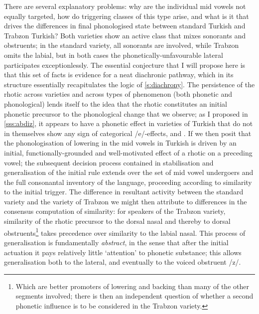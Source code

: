 There are several explanatory problems: why are the individual mid vowels not equally targeted, how do triggering classes of this type arise, and what is it that drives the differences in final phonologised state between standard Turkish and Trabzon Turkish? Both varieties show an active class that mixes sonorants and obstruents; in the standard variety, all sonorants are involved, while Trabzon omits the labial, but in both cases the phonetically-unfavourable lateral participates exceptionlessly. The essential conjecture that I will propose here is that this set of facts is evidence for a neat diachronic pathway, which in its structure essentially recapitulates the logic of \cref{s:diachrony}. The persistence of the rhotic across varieties and across types of phenomenon (both phonetic and phonological) lends itself to the idea that the rhotic constitutes an initial phonetic precursor to the phonological change that we observe; as I proposed in \cref{sss:abdiz}, it appears to have a phonetic effect in varieties of Turkish that do not in themselves show any sign of categorical /e/-effects, and . If we then posit that the phonologisation of lowering in the mid vowels in Turkish is driven by an initial, functionally-grounded and well-motivated effect of a rhotic on a preceding vowel; the subsequent decision process contained in stabilisation and generalisation of the initial rule extends over the set of mid vowel undergoers and the full consonantal inventory of the language, proceeding according to similarity to the initial trigger. The difference in resultant activity between the standard variety and the variety of Trabzon we might then attribute to differences in the consensus computation of similarity: for speakers of the Trabzon variety, similarity of the rhotic precursor to the dorsal nasal and thereby to dorsal obstruents\footnote{Which are better promoters of lowering and backing than many of the other segments involved; there is then an independent question of whether a second phonetic influence is to be considered in the Trabzon variety.} takes precedence over similarity to the labial nasal. This process of generalisation is fundamentally \emph{abstract}, in the sense that after the initial actuation it pays relatively little `attention' to phonetic substance; this allows generalisation both to the lateral, and eventually to the voiced obstruent /z/.

%

